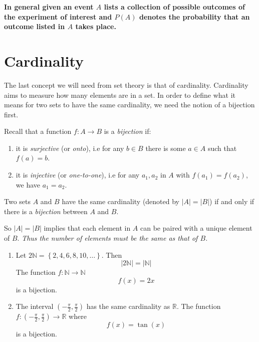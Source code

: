 \begin{appendices}
		 \textbf{In general given an event $A$ lists a collection of possible outcomes of the experiment of interest  and $P(A)$ denotes the probability that an outcome listed in $A$ takes place.} 

    \section{Cardinality}

    The last concept we will need from set theory is that of cardinality. Cardinality aims to measure how many elements are in a set. In order to define what it means for two sets to have the same cardinality, we need the notion of a bijection first.

    Recall that a function $f: A \rightarrow B$ is a \textit{bijection} if:
    \begin{enumerate}
        \item it is \textit{surjective} (or \textit{onto}), i.e for any $b\in B$ there is some $a \in A$ such that $f(a) = b$.
        \item it is \textit{injective} (or \textit{one-to-one}), i.e for any $a_1, a_2$ in $A$ with $f(a_1) = f(a_2)$, we have $a_1 = a_2$.
    \end{enumerate}
    
    \begin{defn}
        Two sets $A$ and $B$ have the same cardinality (denoted by $|A| = |B|$) if and only if there is a \textit{bijection} between $A$ and $B$.
    \end{defn}

   

    So $|A| = |B|$ implies that each element in $A$ can be paired with a unique element of $B$. \textit{Thus the number of elements must be the same as that of $B$.}
    \begin{ex}
        \begin{enumerate}
            \item Let $2 \mathbb{N} = \left\{2,4,6,8,10,\ldots\right\}$. Then
            \[
            |2\mathbb{N}| = |\mathbb{N}|
            \]
            The function $f: \mathbb{N} \rightarrow \mathbb{N}$
            \[
            f(x) = 2x
            \]
            is a bijection.
            \item The interval $(-\frac{\pi}{2}, \frac{\pi}{2})$ has the same cardinality as $\mathbb{R}$. The function $f: (-\frac{\pi}{2}, \frac{\pi}{2}) \rightarrow \mathbb{R}$ where
            \[
            f(x) = \tan(x)
            \]
            is a bijection.
        \end{enumerate}
    \end{ex}


\end{appendices}

